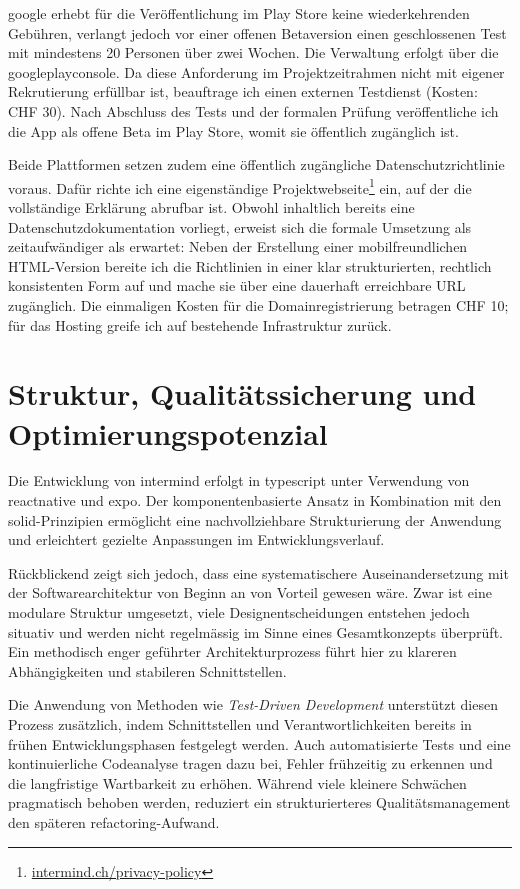 \gls{google} erhebt für die Veröffentlichung im Play Store keine wiederkehrenden Gebühren, verlangt jedoch vor einer offenen Betaversion einen geschlossenen Test mit mindestens 20 Personen über zwei Wochen. Die Verwaltung erfolgt über die \gls{googleplayconsole}. Da diese Anforderung im Projektzeitrahmen nicht mit eigener Rekrutierung erfüllbar ist, beauftrage ich einen externen Testdienst (Kosten: CHF 30). Nach Abschluss des Tests und der formalen Prüfung veröffentliche ich die App als offene Beta im Play Store, womit sie öffentlich zugänglich ist.

Beide Plattformen setzen zudem eine öffentlich zugängliche Datenschutzrichtlinie voraus. Dafür richte ich eine eigenständige Projektwebseite\footnote{\href{https://intermind.ch/privacy-policy.html?lang=de}{intermind.ch/privacy-policy}} ein, auf der die vollständige Erklärung abrufbar ist. Obwohl inhaltlich bereits eine Datenschutzdokumentation vorliegt, erweist sich die formale Umsetzung als zeitaufwändiger als erwartet: Neben der Erstellung einer mobilfreundlichen HTML-Version bereite ich die Richtlinien in einer klar strukturierten, rechtlich konsistenten Form auf und mache sie über eine dauerhaft erreichbare URL zugänglich. Die einmaligen Kosten für die Domainregistrierung betragen CHF 10; für das Hosting greife ich auf bestehende Infrastruktur zurück.

\section{Struktur, Qualitätssicherung und Optimierungspotenzial}

Die Entwicklung von \gls{intermind} erfolgt in \gls{typescript} unter Verwendung von \gls{reactnative} und \gls{expo}. Der komponentenbasierte Ansatz in Kombination mit den \gls{solid}-Prinzipien ermöglicht eine nachvollziehbare Strukturierung der Anwendung und erleichtert gezielte Anpassungen im Entwicklungsverlauf.

Rückblickend zeigt sich jedoch, dass eine systematischere Auseinandersetzung mit der Softwarearchitektur von Beginn an von Vorteil gewesen wäre. Zwar ist eine modulare Struktur umgesetzt, viele Designentscheidungen entstehen jedoch situativ und werden nicht regelmässig im Sinne eines Gesamtkonzepts überprüft. Ein methodisch enger geführter Architekturprozess führt hier zu klareren Abhängigkeiten und stabileren Schnittstellen.

Die Anwendung von Methoden wie \emph{Test-Driven Development} unterstützt diesen Prozess zusätzlich, indem Schnittstellen und Verantwortlichkeiten bereits in frühen Entwicklungsphasen festgelegt werden. Auch automatisierte Tests und eine kontinuierliche Codeanalyse tragen dazu bei, Fehler frühzeitig zu erkennen und die langfristige Wartbarkeit zu erhöhen. Während viele kleinere Schwächen pragmatisch behoben werden, reduziert ein strukturierteres Qualitätsmanagement den späteren \gls{refactoring}-Aufwand.

